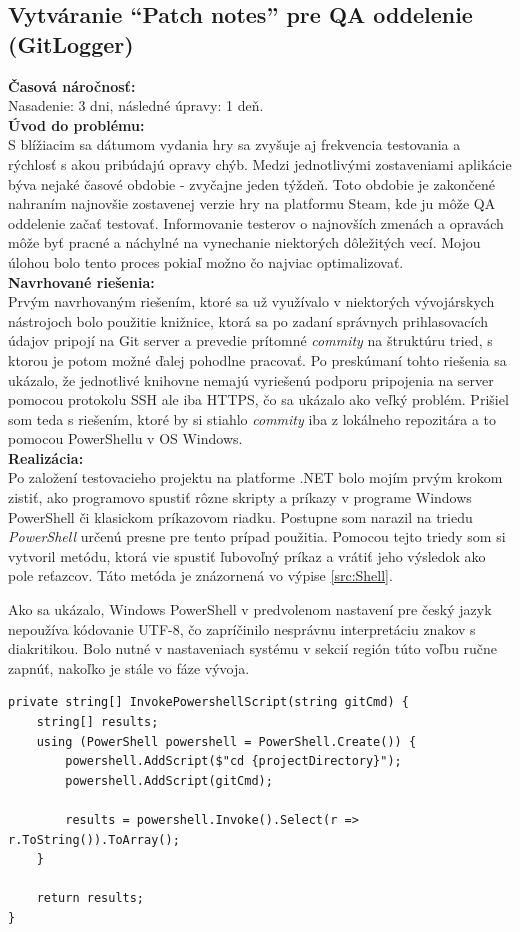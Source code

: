 \documentclass[slovak, bachelorpractice]{diploma}
\begin{document}
\subsection{Vytváranie \enquote{Patch notes} pre QA oddelenie (GitLogger)}
\label{sec:GitLogger}
\textbf{Časová náročnosť:} \\ Nasadenie: 3 dni, následné úpravy: 1 deň.\\
\textbf{Úvod do problému:} \\ S blížiacim sa dátumom vydania hry sa zvyšuje aj frekvencia testovania a rýchlosť s akou pribúdajú opravy chýb. Medzi jednotlivými zostaveniami aplikácie býva nejaké časové obdobie - zvyčajne jeden týždeň. Toto obdobie je zakončené nahraním najnovšie zostavenej verzie hry na platformu Steam, kde ju môže QA oddelenie začať testovať. Informovanie testerov o najnovších zmenách a opravách môže byť pracné a náchylné na vynechanie niektorých dôležitých vecí. Mojou úlohou bolo tento proces pokiaľ možno čo najviac optimalizovať.\\
\textbf{Navrhované riešenia:} \\ Prvým navrhovaným riešením, ktoré sa už využívalo v niektorých vývojárskych nástrojoch bolo použitie knižnice, ktorá sa po zadaní správnych prihlasovacích údajov pripojí na Git server a prevedie prítomné \textit{commity} na štruktúru tried, s ktorou je potom možné ďalej pohodlne pracovať. Po preskúmaní tohto riešenia sa ukázalo, že jednotlivé knihovne nemajú vyriešenú podporu pripojenia na server pomocou protokolu SSH ale iba HTTPS, čo sa ukázalo ako veľký problém. Prišiel som teda s riešením, ktoré by si stiahlo \textit{commity} iba z lokálneho repozitára a to pomocou PowerShellu v OS Windows.  \\
\textbf{Realizácia:} \\ Po založení testovacieho projektu na platforme .NET bolo mojím prvým krokom zistiť, ako programovo spustiť rôzne skripty a príkazy v programe Windows PowerShell či klasickom príkazovom riadku. Postupne som narazil na triedu \textit{PowerShell} určenú presne pre tento prípad použitia. Pomocou tejto triedy som si vytvoril metódu, ktorá vie spustiť ľubovoľný príkaz a vrátiť jeho výsledok ako pole reťazcov. Táto metóda je znázornená vo výpise \ref{src:Shell}. 

Ako sa ukázalo, Windows PowerShell v predvolenom nastavení pre český jazyk nepoužíva kódovanie UTF-8, čo zapríčinilo nesprávnu interpretáciu znakov s diakritikou. Bolo nutné v nastaveniach systému v sekcií región túto voľbu ručne zapnúť, nakoľko je stále vo fáze vývoja.
\vspace{10pt}
\begin{lstlisting}[label=src:Shell,caption={Metóda vykonávajúca skript v programe Powershell}]
private string[] InvokePowershellScript(string gitCmd) {
    string[] results;
    using (PowerShell powershell = PowerShell.Create()) {
        powershell.AddScript($"cd {projectDirectory}");
        powershell.AddScript(gitCmd);

        results = powershell.Invoke().Select(r => r.ToString()).ToArray();
    }

    return results;
}
\end{lstlisting}
\end{document}
